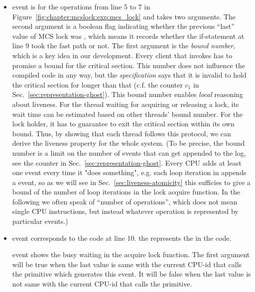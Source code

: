 \begin{itemize}

\item \textbf{{}} event is for the
operations from line 5 to 7 in Figure~\ref{fig:chapter:mcslock:exp:mcs_lock} and takes
two arguments. The second argument is a boolean flag indicating
whether the previous ``last'' value of MCS lock was \invalidmcsval,
which means it records whether the if-statement at line 9 took the fast path or not.
The first argument is the \emph{bound number}, which is a key idea in
our development. Every client that invokes  has
to promise a bound for the critical section. This number
does not influence the compiled code in any way, but the
\emph{specification} says that it is invalid to hold the critical
section for longer than that (c.f. the counter $c_1$ in
Sec.~\ref{sec:representation-ghost}).
This bound number enables \emph{local} reasoning about liveness.
For the thread waiting for acquiring or releasing a lock,
its wait time can be estimated based on other threads' bound number. For the lock holder, it has to guarantee
to exit the critical section within its own bound. 
Thus, by showing that each thread follows this protocol,
we can derive the liveness property for the whole system.
(To be precise, the bound number is a limit on the number of events
that can get appended to the log, see the counter  in
Sec.~\ref{sec:representation-ghost}.
Every CPU adds at least
one event every time it "does something", e.g. each loop iteration in  appends a 
event, so
as we will see in
Sec.~\ref{sec:liveness-atomicity} this sufficies to give a bound of
the number of loop iterations in the lock acquire function. In the following we often speak of
``number of operations'', which does not mean single CPU instructions,
but instead whatever operation is represented by particular events.)


\item \textbf{} event corresponds to the code at line 10. 
the  represents the  in the code.

\noindent\textbf{} event shows the busy waiting in the acquire lock function.
The first argument will be true when the last value is same with the current CPU-id that calls the primitive which generates this event.
It will be false when the last value is not same with the current CPU-id that calls the primitive.
\end{itemize}

